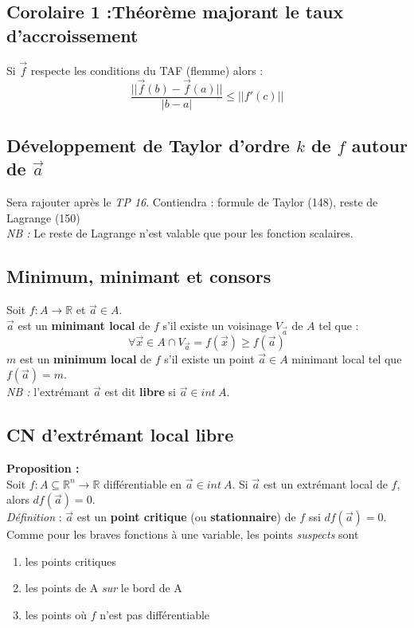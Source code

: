\documentclass	[11pt, a4paper, openany]{book}
\begin{document}
\subsection*{Corolaire 1 :Théorème majorant le taux d'accroissement}
Si $\vec{f}$ respecte les conditions du TAF (flemme) alors :
$$\frac{||\vec{f}(b) - \vec{f}(a)||}{|b -a|} \leq ||f'(c)||$$

\subsection{Développement de Taylor d'ordre $k$ de $f$ autour de $\vec{a}$}
Sera rajouter après le \textit{TP 16}. Contiendra : formule de Taylor (148), reste de Lagrange (150) \\

\textit{NB : } Le reste de Lagrange n'est valable que pour les fonction scalaires.

\subsection{Minimum, minimant et consors}
Soit $f : A \rightarrow \mathbb{R}$ et $\vec{a} \in A$.\\
$\vec{a}$ est un \textbf{minimant local} de $f$ s'il existe un voisinage $V_{\vec{a}}$ de $A$ tel que :
$$\forall \vec{x} \in A \cap V_{\vec{a}} = f(\vec{x}) \geq f(\vec{a})$$
$m$ est un \textbf{minimum local} de $f$ s'il existe un point $\vec{a} \in A$ minimant local tel que $f(\vec{a}) = m$.\\

\textit{NB : } l'extrémant $\vec{a}$ est dit \textbf{libre} si $\vec{a} \in int\ A$.

\subsection{CN d'extrémant local libre}
\textbf{Proposition : }\\
Soit $f : A \subseteq \mathbb{R}^n \rightarrow \mathbb{R}$ différentiable en $\vec{a} \in int\ A$. Si $\vec{a}$ est un extrémant local de $f$, alors $df(\vec{a}) = 0$.\\

\emph{Définition} : $\vec{a}$ est un \textbf{point critique} (ou \textbf{stationnaire}) de $f$ ssi $df(\vec{a}) = 0$.\\
Comme pour les braves fonctions à une variable, les points \textit{suspects} sont 
\begin{enumerate}
\item les points critiques
\item les points de A \textit{sur} le bord de A
\item les points où $f$ n'est pas différentiable
\end{enumerate}
\end{document}
